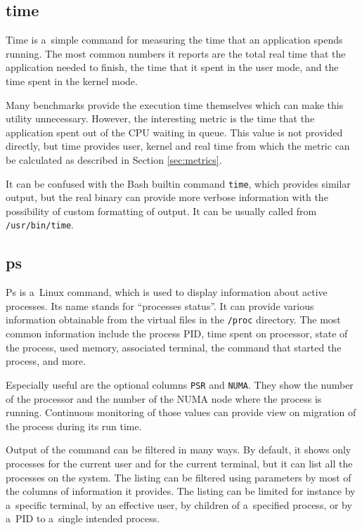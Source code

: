 \subsection{time}
Time is a~simple command for measuring the time that an application spends
running. The most common numbers it reports are the total real time that the
application needed to finish, the time that it spent in the user mode, and the
time spent in the kernel mode.

Many benchmarks provide the execution time themselves which can make this
utility unnecessary. However, the interesting metric is the time that the
application spent out of the CPU waiting in queue. This value is not provided
directly, but time provides user, kernel and real time from which the metric can be
calculated as described in Section \ref{sec:metrics}.

It can be confused with the Bash builtin command \texttt{time}, which provides similar
output, but the real binary can provide more verbose information with
the possibility of custom formatting of output. It can be usually called from
\texttt{/usr/bin/time}.

\subsection{ps}
Ps is a~Linux command, which is used to display information about active processes. Its name
stands for ``processes status''. It can provide various information obtainable from
the virtual files in the \texttt{/proc} directory. The most common information
include the process PID, time spent on processor, state of the process, used memory,
associated terminal, the command that started the process, and more.

Especially useful are the optional columns \texttt{PSR} and \texttt{NUMA}. They
show the number of the processor and the number of the NUMA node where the process is
running. Continuous monitoring of those values can provide view on migration of
the process during its run time. 

Output of the command can be filtered in many ways. By default, it shows only
processes for the current user and for the current terminal, but it can list all
the processes on the system. The listing can be filtered using parameters by
most of the columns of information it provides. The listing can be limited for
instance by a~specific terminal, by an effective user, by children of a~specified process,
or by a~PID to a~single intended process.

